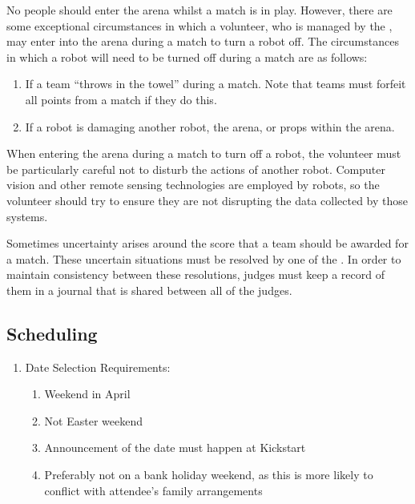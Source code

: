 No people should enter the arena whilst a match is in play.  However, there are some exceptional circumstances in which a volunteer, who is managed by the , may enter into the arena during a match to turn a robot off.  The circumstances in which a robot will need to be turned off during a match are as follows:
\begin{enumerate}
\item If a team ``throws in the towel'' during a match.  Note that teams must forfeit all points from a match if they do this.
\item If a robot is damaging another robot, the arena, or props within the arena.
\end{enumerate}
When entering the arena during a match to turn off a robot, the volunteer must be particularly careful not to disturb the actions of another robot.  Computer vision and other remote sensing technologies are employed by robots, so the volunteer should try to ensure they are not disrupting the data collected by those systems.

Sometimes uncertainty arises around the score that a team should be awarded for a match.  These uncertain situations must be resolved by one of the .  In order to maintain consistency between these resolutions, judges must keep a record of them in a journal that is shared between all of the judges.

\subsection{Scheduling}
\begin{enumerate}
\item Date Selection Requirements:
  \begin{enumerate}
  \item Weekend in April
  \item Not Easter weekend
  \item Announcement of the date must happen at Kickstart
  \item Preferably not on a bank holiday weekend, as this is more likely to conflict with attendee's family arrangements
  \end{enumerate}
\end{enumerate}
  
